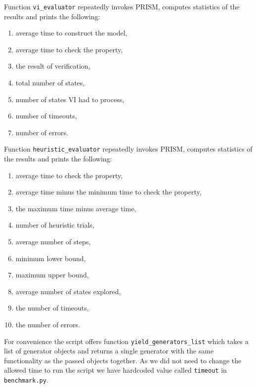 \pagebreak

Function \verb|vi_evaluator| repeatedly invokes PRISM, computes
statistics of the results and prints the following:
\begin{enumerate}
    \item average time to construct the model,
    \item average time to check the property,
    \item the result of verification,
    \item total number of states,
    \item number of states VI had to process,
    \item number of timeouts,
    \item number of errors.
\end{enumerate}

Function \verb|heuristic_evaluator| repeatedly invokes PRISM, computes
statistics of the results and prints the following:
\begin{enumerate}
    \item average time to check the property,
    \item average time minus the minimum time to check the property,
    \item the maximum time minus average time,
    \item number of heuristic trials,
    \item average number of steps,
    \item minimum lower bound,
    \item maximum upper bound,
    \item average number of states explored,
    \item the number of timeouts,
    \item the number of errors.
\end{enumerate}

For convenience the script offers function \verb|yield_generators_list|
which takes a list of generator objects and returns a single generator
with the same functionality as the passed objects together.
As we did not need to change the allowed time to run the script we have
hardcoded value called \verb|timeout| in \verb|benchmark.py|.
